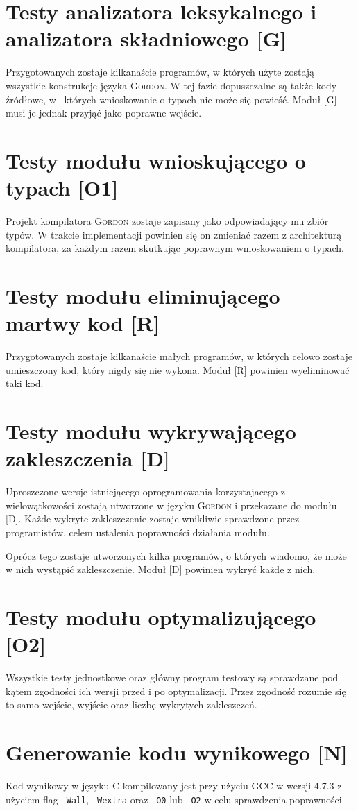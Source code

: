 \documentclass{documentation}
\begin{document}
\section{Testy analizatora leksykalnego i analizatora składniowego [G]}
\noindent Przygotowanych zostaje kilkanaście programów, w których użyte
zostają wszystkie konstrukcje języka \textsc{Gordon}. W tej fazie dopuszczalne
są także kody źródłowe, w~ których wnioskowanie o typach nie może się powieść.
Moduł [G] musi je jednak przyjąć jako poprawne wejście.

\section{Testy modułu wnioskującego o typach [O1]}
\noindent Projekt kompilatora \textsc{Gordon} zostaje zapisany jako
odpowiadający mu zbiór typów. W trakcie implementacji powinien się on zmieniać
razem z architekturą kompilatora, za każdym razem skutkując poprawnym
wnioskowaniem o typach.

\section{Testy modułu eliminującego martwy kod [R]}
\noindent Przygotowanych zostaje kilkanaście małych programów, w których celowo
zostaje umieszczony kod, który nigdy się nie wykona. Moduł [R] powinien
wyeliminować taki kod.

\section{Testy modułu wykrywającego zakleszczenia [D]}
\noindent Uproszczone wersje istniejącego oprogramowania korzystajacego z
wielowątkowości zostają utworzone w języku \textsc{Gordon} i przekazane do
modułu [D]. Każde wykryte zakleszczenie zostaje wnikliwie sprawdzone przez
programistów, celem ustalenia poprawności działania modułu.

Oprócz tego zostaje utworzonych kilka programów, o których wiadomo, że może w
nich wystąpić zakleszczenie. Moduł [D] powinien wykryć każde z nich.

\section{Testy modułu optymalizującego [O2]}
\noindent Wszystkie testy jednostkowe oraz główny program testowy są sprawdzane
pod kątem zgodności ich wersji przed i po optymalizacji. Przez zgodność rozumie
się to samo wejście, wyjście oraz liczbę wykrytych zakleszczeń.

\section{Generowanie kodu wynikowego [N]}
\noindent Kod wynikowy w języku \textsc{C} kompilowany jest przy użyciu
\textsc{GCC} w wersji 4.7.3 z użyciem flag \texttt{-Wall}, \texttt{-Wextra} oraz
\texttt{-O0} lub \texttt{-O2} w celu sprawdzenia poprawności.
\end{document}
